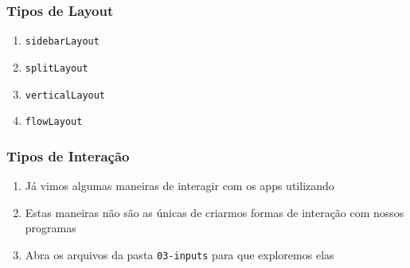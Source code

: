 \documentclass[12pt, compress, usetitleprogressbar]{beamer}\usepackage[]{graphicx}\usepackage[]{color}
\begin{document}
\begin{frame}

\frametitle{Tipos de Layout}

\begin{enumerate}[label=$\bullet$, leftmargin=*]

  \item \texttt{sidebarLayout}

  \item \texttt{splitLayout}

  \item \texttt{verticalLayout}

  \item \texttt{flowLayout}

\end{enumerate}

\end{frame}




















\begin{frame}

\frametitle{Tipos de Interação}

\begin{enumerate}[label=$\bullet$, leftmargin=*]

  \item Já vimos algumas maneiras de interagir com os apps utilizando

  \item Estas maneiras não são as únicas de criarmos formas de interação com nossos programas

  \item Abra os arquivos da pasta \texttt{03-inputs} para que exploremos elas

\end{enumerate}

\end{frame}

\end{document}
